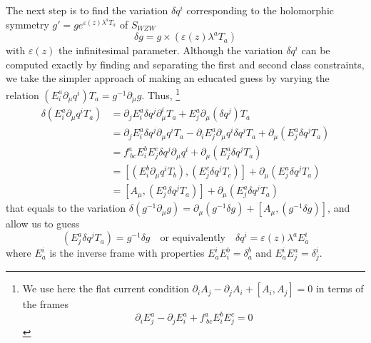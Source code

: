\documentclass[a4paper,12pt]{article}
\numberwithin{equation}{section}
\numberwithin{thm}{section}
\numberwithin{exm}{section}
\newcommand{\p}{\partial}
\newcommand{\mo}{^{-1}}
\newcommand{\<}{{\langle}}
\renewcommand{\>}{{\rangle}}
\renewcommand{\d}{{\delta}}
\newcommand{\ve}{{\varepsilon}}
\renewcommand{\l}{{\lambda}}
\newcommand{\m}{{\mu}}
\begin{document}
The next step is to find the variation $\d q^i$ corresponding to the holomorphic symmetry $g' = g e^{\ve(z)\l^a T_a}$ of $S_{WZW}$
	\begin{equation}
	\d g = g \times (\ve(z) \l^a T_a)
	\end{equation}
with $\ve(z)$ the infinitesimal parameter. Although the variation $\d q^i$ can be computed exactly\cite{Sazdovic1995} by finding and separating the first and second class constraints, we take the simpler approach of making an educated guess by varying the relation $(E^a_i \p_\m q^i) T_a = g\mo \p_\m g$. Thus,%
\footnote{We use here the flat current condition $\p_i A_j - \p_j A_i + [A_i, A_j] = 0$ in terms of the frames
$$\p_i E_j^a - \p_j E_i^a + f^a_{\ bc} E_i^b E_j^c = 0$$}
	\begin{align}
	\d(E^a_i \p_\m q^i T_a) & = \p_jE^a_i \d q^j \p_\m^i T_a + E^a_j\p_\m(\d q^j) T_a \nonumber \\
	& = \p_jE^a_i \d q^j \p_\m q^i T_a - \p_i E^a_j \p_\m q^i \d q^j T_a + \p_\m(E^a_j \d q^j T_a) \nonumber \\
	& = f^a_{\ bc} E^b_i E^c_j \d q^j \p_\m q^i + \p_\m(E^a_j \d q^j T_a) \nonumber \\
	& = [(E^b_i\p_\m q^i T_b), (E^c_j\d q^jT_c)] + \p_\m(E^a_j \d q^j T_a) \nonumber \\
	& = [A_\m, (E^a_j\d q^jT_a)] + \p_\m(E^a_j \d q^j T_a)
	\end{align}
that equals to the variation $\d (g\mo \p_\m g) = \p_\m(g\mo\d g) + [A_\m, (g\mo\d g)]$, and allow us to guess
	\begin{equation}
	(E^a_j \d q^j T_a) = g\mo \d g \quad\text{or equivalently}\quad \d q^i = \ve(z) \l^a E_a^i
	\end{equation}
where $E^i_a$ is the inverse frame with properties $E^i_a E_i^b = \d^b_a$ and $E^i_a E^a_j = \d^i_j$.
\end{document}
